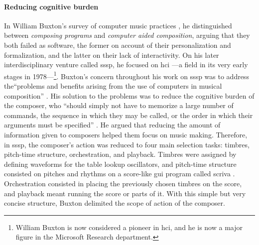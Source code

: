 	\paragraph{Reducing cognitive burden}
	In William Buxton's survey of computer music practices \parencite{Bux77:Aco, icmc/bbp2372.1978.012, DBLP:conf/icmc/BuxtonPRB80}, he distinguished between \textit{composing programs} and \textit{computer aided composition}, arguing that they both failed as software, the former on account of their personalization and formalization, and the latter on their lack of interactivity. On his later interdisciplinary venture called \gls{sssp}, he focused on \gls{hci} ---a field in its very early stages in 1978---\footnote{William Buxton is now considered a pioneer in \gls{hci}, and he is now a major figure in the Microsoft Research department.}. Buxton's concern throughout his work on \gls{sssp} was to address the``problems and benefits arising from the use of computers in musical composition'' \parencite[472]{DBLP:conf/icmc/BuxtonFBRSCM78}. His solution to the problems was to reduce the cognitive burden of the composer, who ``should simply not have to memorize a large number of commands, the sequence in which they may be called, or the order in which their arguments must be specified'' \parencite[474]{DBLP:conf/icmc/BuxtonFBRSCM78}. He argued that reducing the amount of information given to composers helped them focus on music making. Therefore, in \gls{sssp}, the composer's action was reduced to four main selection tasks: timbres, pitch-time structure, orchestration, and playback. Timbres were assigned by defining waveforms for the table lookup oscillators, and pitch-time structure consisted on pitches and rhythms on a score-like \gls{gui} program called \gls{scriva} \parencite{youtube/buxton10}. Orchestration consisted in placing the previously chosen timbres on the score, and playback meant running the score or parts of it. With this simple but very concise structure, Buxton delimited the scope of action of the composer.

